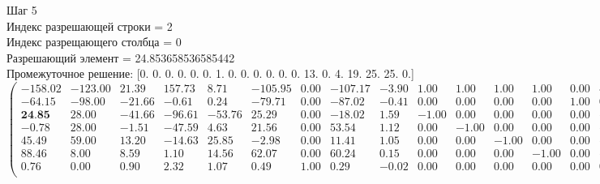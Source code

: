 \documentclass[draft]{article}
\begin{document}
\begin{flushleft}
    Шаг 5 \\
    Индекс разрешающей строки = 2\\
    Индекс разрещающего столбца = 0\\
    Разрешающий элемент = 24.853658536585442\\
    Промежуточное решение:
    [0.  0.  0.  0.  0.  0.  1.  0.  0.  0.  0.  0.  0.  13.  0.  4.  19.  25.  25.  0.]
\begin{equation*}
\begin{pmatrix}
    -158.02 & -123.00 &  21.39 & 157.73 &   8.71 & -105.95 & 0.00 & -107.17 & -3.90 &  1.00 &  1.00 &  1.00 &  1.00 & 0.00 &  4.90 & 0.00 & 0.00 & 0.00 & 0.00 &  1.00 & -73.00 \\
    -64.15 &  -98.00 & -21.66 &  -0.61 &   0.24 &  -79.71 & 0.00 &  -87.02 & -0.41 &  0.00 &  0.00 &  0.00 &  0.00 & 1.00 &  0.41 & 0.00 & 0.00 & 0.00 & 0.00 & -1.00 &  13.00 \\
    \textbf{24.85} &   28.00 & -41.66 & -96.61 & -53.76 &   25.29 & 0.00 &  -18.02 &  1.59 & -1.00 &  0.00 &  0.00 &  0.00 & 0.00 & -1.59 & 1.00 & 0.00 & 0.00 & 0.00 &  0.00 &   4.00 \\
    -0.78 &   28.00 &  -1.51 & -47.59 &   4.63 &   21.56 & 0.00 &   53.54 &  1.12 &  0.00 & -1.00 &  0.00 &  0.00 & 0.00 & -1.12 & 0.00 & 1.00 & 0.00 & 0.00 &  0.00 &  19.00 \\
    45.49 &   59.00 &  13.20 & -14.63 &  25.85 &   -2.98 & 0.00 &   11.41 &  1.05 &  0.00 &  0.00 & -1.00 &  0.00 & 0.00 & -1.05 & 0.00 & 0.00 & 1.00 & 0.00 &  0.00 &  25.00 \\
    88.46 &    8.00 &   8.59 &   1.10 &  14.56 &   62.07 & 0.00 &   60.24 &  0.15 &  0.00 &  0.00 &  0.00 & -1.00 & 0.00 & -0.15 & 0.00 & 0.00 & 0.00 & 1.00 &  0.00 &  25.00 \\
    0.76 &    0.00 &   0.90 &   2.32 &   1.07 &    0.49 & 1.00 &    0.29 & -0.02 &  0.00 &  0.00 &  0.00 &  0.00 & 0.00 &  0.02 & 0.00 & 0.00 & 0.00 & 0.00 &  0.00 &   1.00 \\
\end{pmatrix}
\end{equation*}
\end{flushleft}
\end{document}

